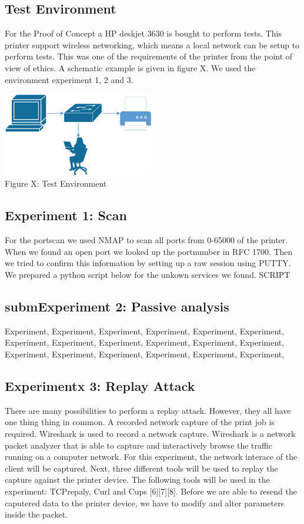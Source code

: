 \documentclass[a4paper]{article}
\begin{document}
\subsection{Test Environment}
For the Proof of Concept a HP deskjet 3630 is bought to perform tests. This printer support wireless networking, which means a local network can be setup to perform tests. This was one of the requirements of the printer from the point of view of ethics. A schematic example is given in figure X. We used the environment experiment 1, 2 and 3.
\begin{center}
	\includegraphics[width=0.5\textwidth]{testenv.png}\\
	Figure X: Test Environment
\end{center}

\subsection{Experiment 1: Scan}
For the portscan we used NMAP to scan all ports from 0-65000 of the printer. When we found an open port we looked up the portnumber in RFC 1700. Then we tried to confirm this information by setting up a raw session using PUTTY. We prepared a python script below for the unkown services we found.
SCRIPT

\subsection{submExperiment 2: Passive analysis}
Experiment, Experiment, Experiment, Experiment, Experiment, Experiment, Experiment, Experiment, Experiment, Experiment, Experiment, Experiment, Experiment, Experiment, Experiment, Experiment, Experiment, Experiment,

\subsection{Experimentx 3: Replay Attack }
There are many possibilities to perform a replay attack. However, they all
have one thing thing in common. A recorded network capture of the print
job is required. Wireshark is used to record a network capture.
Wireshark is a network packet analyzer that is able to capture and
interactively browse the traffic running on a computer network. For this
experiment,  the network interace of the client will be captured. Next,
three different tools will be used to replay the capture against the
printer device. The following tools will be used in the experiment:
TCPrepaly, Curl and Cups [6][7][8]. Before we are able to resend the
caputered data to the printer device, we have to modify and alter
parameters inside the packet.
\end{document}
